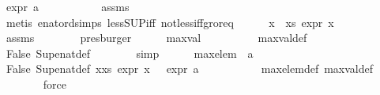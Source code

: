\begin{isabellebody}
\ {\isachardoublequoteopen}expr{\isacharunderscore}{\kern0pt}{}\ a\ {\isacharequal}{\kern0pt}\ {\isasyminfinity}{\isachardoublequoteclose}\ \isanewline
\ \ \ \ \ \ \isamarkupfalse%
\ assms\isanewline
\ \ \ \ \ \ \isamarkupfalse%
\ {\isacharparenleft}{\kern0pt}metis\ enat{\isacharunderscore}{\kern0pt}ord{\isacharunderscore}{\kern0pt}simps{\isacharparenleft}{\kern0pt}{}{\isacharparenright}{\kern0pt}\ less{\isacharunderscore}{\kern0pt}SUP{\isacharunderscore}{\kern0pt}iff\ not{\isacharunderscore}{\kern0pt}less{\isacharunderscore}{\kern0pt}iff{\isacharunderscore}{\kern0pt}gr{\isacharunderscore}{\kern0pt}or{\isacharunderscore}{\kern0pt}eq{\isacharparenright}{\kern0pt}\isanewline
\ \ \ \ \isamarkupfalse%
\ {\isachardoublequoteopen}{\isasymforall}x\ {\isasymin}\ xs{\isachardot}{\kern0pt}\ expr{\isacharunderscore}{\kern0pt}{}\ x\ {\isacharless}{\kern0pt}\ {\isasyminfinity}{\isachardoublequoteclose}\isanewline
\ \ \ \ \ \ \isamarkupfalse%
\ assms\isanewline
\ \ \ \ \ \ \isamarkupfalse%
\ presburger\isanewline
\ \ \ \ \isamarkupfalse%
\ {\isachardoublequoteopen}max{\isacharunderscore}{\kern0pt}val\ {\isacharequal}{\kern0pt}\ {\isasyminfinity}{\isachardoublequoteclose}\isanewline
\ \ \ \ \ \ \isamarkupfalse%
\ max{\isacharunderscore}{\kern0pt}val{\isacharunderscore}{\kern0pt}def\isanewline
\ \ \ \ \ \ \isamarkupfalse%
\ False\ Sup{\isacharunderscore}{\kern0pt}enat{\isacharunderscore}{\kern0pt}def\isanewline
\ \ \ \ \ \ \isamarkupfalse%
\ simp\isanewline
\ \ \ \ \isamarkupfalse%
\ {\isachardoublequoteopen}max{\isacharunderscore}{\kern0pt}elem\ {\isacharequal}{\kern0pt}\ a{\isachardoublequoteclose}\ \isanewline
\ \ \ \ \ \ \isamarkupfalse%
\ False\ Sup{\isacharunderscore}{\kern0pt}enat{\isacharunderscore}{\kern0pt}def\ {\isacartoucheopen}{\isasymforall}x{\isasymin}xs{\isachardot}{\kern0pt}\ expr{\isacharunderscore}{\kern0pt}{}\ x\ {\isacharless}{\kern0pt}\ {\isasyminfinity}{\isacartoucheclose}\ {\isacartoucheopen}expr{\isacharunderscore}{\kern0pt}{}\ a\ {\isacharequal}{\kern0pt}\ {\isasyminfinity}{\isacartoucheclose}\ \isanewline
\ \ \ \ \ \ \isamarkupfalse%
\ max{\isacharunderscore}{\kern0pt}elem{\isacharunderscore}{\kern0pt}def\ max{\isacharunderscore}{\kern0pt}val{\isacharunderscore}{\kern0pt}def\isanewline
\ \ \ \ \ \ \isamarkupfalse%
\ force\isanewline
\ \ \ \ \isamarkupfalse%

\end{isabellebody}
